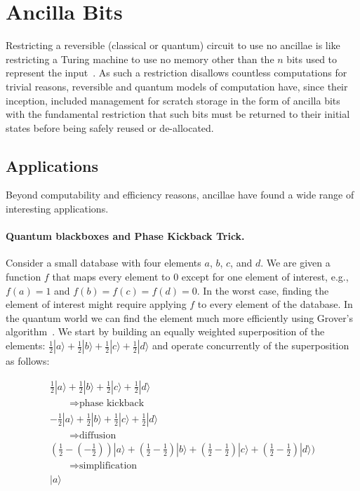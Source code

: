 \documentclass[sigplan,10pt,review,anonymous]{acmart}
\newcommand{\ket}[1]{|#1\rangle}
\begin{document}
\section{Ancilla Bits}
\label{sec:examples}

Restricting a reversible (classical or quantum) circuit to use no
ancillae is like restricting a Turing machine to use no memory other
than the $n$ bits used to represent the
input~\cite{aaronson_et_al:LIPIcs:2017:8173}. As such a restriction
disallows countless computations for trivial reasons, reversible and
quantum models of computation have, since their inception, included
management for scratch storage in the form of ancilla
bits~\cite{Toffoli:1980} with the fundamental restriction that such
bits must be returned to their initial states before being safely
reused or de-allocated.

\subsection{Applications}

Beyond computability and efficiency reasons, ancillae have found a
wide range of interesting applications.

\paragraph*{Quantum blackboxes and Phase Kickback Trick.} Consider a
small database with four elements $a$, $b$, $c$, and $d$. We are given
a function $f$ that maps every element to $0$ except for one element
of interest, e.g., $f(a)=1$ and $f(b)=f(c)=f(d)=0$. In the worst case,
finding the element of interest might require applying $f$ to every
element of the database. In the quantum world we can find the element
much more efficiently using Grover's
algorithm~\cite{Grover:1996:FQM:237814.237866}. We start by building
an equally weighted superposition of the elements:
$\frac{1}{2}\ket{a}+\frac{1}{2}\ket{b}+\frac{1}{2}\ket{c}+\frac{1}{2}\ket{d}$
and operate concurrently of the superposition as follows:

\[\begin{array}{l}
\frac{1}{2}\ket{a}+\frac{1}{2}\ket{b}+\frac{1}{2}\ket{c}+\frac{1}{2}\ket{d}\\ [1.5ex]
\qquad\Rightarrow  \textrm{phase kickback} \\ [1.5ex]
-\frac{1}{2}\ket{a}+\frac{1}{2}\ket{b}+\frac{1}{2}\ket{c}+\frac{1}{2}\ket{d}\\ [1.5ex]
\qquad\Rightarrow  \textrm{diffusion} \\ [1.5ex]
 (\frac{1}{2}-(-\frac{1}{2}))\ket{a}+(\frac{1}{2}-\frac{1}{2})\ket{b}+(\frac{1}{2}-\frac{1}{2})\ket{c}+(\frac{1}{2}-\frac{1}{2})\ket{d})\\ [1.5ex]
\qquad\Rightarrow  \textrm{simplification} \\ [1.5ex]
\ket{a}
\end{array}\]
\end{document}
